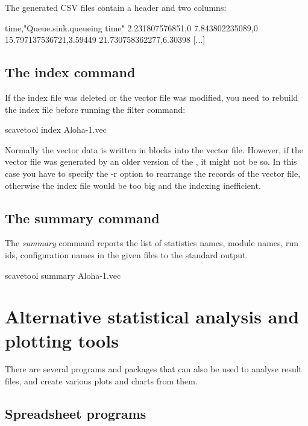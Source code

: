 The generated CSV files contain a header and two columns:

\begin{filelisting}
time,"Queue.sink.queueing time"
2.231807576851,0
7.843802235089,0
15.797137536721,3.59449
21.730758362277,6.30398
[...]
\end{filelisting}


\subsection{The index command}

If the index file was deleted or the vector file was modified, you need to
rebuild the index file before running the filter command:

\begin{commandline}
scavetool index Aloha-1.vec
\end{commandline}

Normally the vector data is written in blocks into the vector file.
However, if the vector file was generated by an older version of the
, it might not be so. In this case you have
to specify the -r option to rearrange the records of the vector file,
otherwise the index file would be too big and the indexing inefficient.

\subsection{The summary command}

The \textit{summary} command reports the list of statistics names, module names,
run ids, configuration names in the given files to the standard output.

\begin{commandline}
scavetool summary Aloha-1.vec
\end{commandline}


\section{Alternative statistical analysis and plotting tools}

There are several programs and packages that can also be used to analyse
result files, and create various plots and charts from them.


\subsection{Spreadsheet programs}


